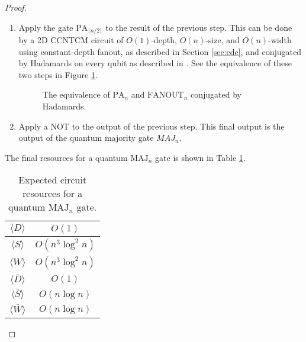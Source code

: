\begin{proof}
\begin{enumerate}
\item
Apply the gate $\text{PA}_{\lceil n/2 \rceil}$ to the result of
the previous step. This can be done by a \textsf{2D CCNTCM} circuit of
$O(1)$-depth, $O(n)$-size, and $O(n)$-width using constant-depth
fanout, as described in Section \ref{sec:cdc}, and conjugated by
Hadamards on every qubit as described in \cite{Moore1998}. See
the equivalence of these two steps in Figure \ref{fig:pa-fanout}.

\begin{figure}[htb!]
\caption{The equivalence of $\text{PA}_n$ and $\text{FANOUT}_n$ conjugated by Hadamards.}
\label{fig:pa-fanout}
\end{figure}

\item
Apply a NOT to the output of the previous step. This final
output is the output of the quantum majority gate $MAJ_{n}$.

\end{enumerate}

The final resources for a quantum $\text{MAJ}_n$ gate is shown in
Table \ref{tab:maj-resources}.

\begin{table}[htb!]
\begin{tabular}{c|c|}
\hline
$\langle D \rangle$ & $O(1)$ \\
\hline
$\langle S \rangle$ & $O(n^3\log^2 n)$ \\
\hline
$\langle W \rangle$ & $O(n^3 \log^2 n)$ \\
\hline
$\langle \overline{D} \rangle$ & $O(1)$ \\
\hline
$\langle \overline{S} \rangle$ & $O(n\log n)$ \\
\hline
$\langle \overline{W} \rangle$ & $O(n\log n)$ \\
\hline
\end{tabular}
\caption{Expected circuit resources for a quantum $\text{MAJ}_n$ gate.}
\label{tab:maj-resources}
\end{table}

\end{proof}